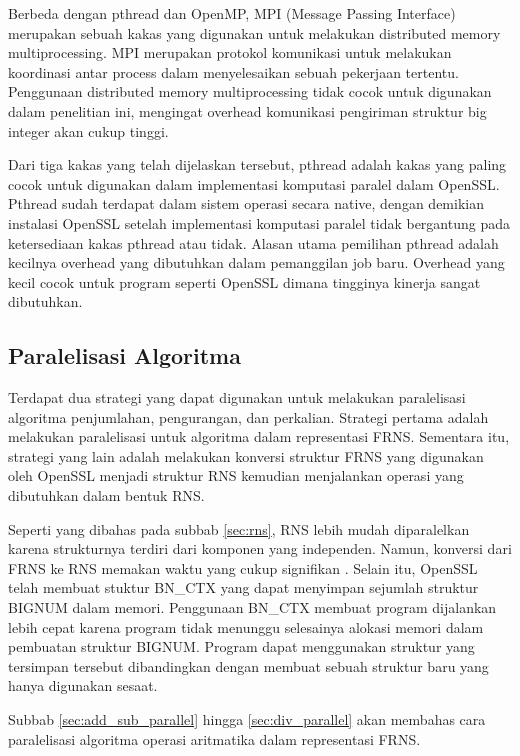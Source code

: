 Berbeda dengan pthread dan OpenMP, MPI (Message Passing Interface) merupakan sebuah kakas yang digunakan untuk melakukan distributed memory multiprocessing. MPI merupakan protokol komunikasi untuk melakukan koordinasi antar process dalam menyelesaikan sebuah pekerjaan tertentu. Penggunaan distributed memory multiprocessing tidak cocok untuk digunakan dalam penelitian ini, mengingat overhead komunikasi pengiriman struktur big integer akan cukup tinggi.

Dari tiga kakas yang telah dijelaskan tersebut, pthread adalah kakas yang paling cocok untuk digunakan dalam implementasi komputasi paralel dalam OpenSSL. Pthread sudah terdapat dalam sistem operasi secara native, dengan demikian instalasi OpenSSL setelah implementasi komputasi paralel tidak bergantung pada ketersediaan kakas pthread atau tidak. Alasan utama pemilihan pthread adalah kecilnya overhead yang dibutuhkan dalam pemanggilan job baru. Overhead yang kecil cocok untuk program seperti OpenSSL dimana tingginya kinerja sangat dibutuhkan.

\subsection{Paralelisasi Algoritma}
Terdapat dua strategi yang dapat digunakan untuk melakukan paralelisasi algoritma penjumlahan, pengurangan, dan perkalian. Strategi pertama adalah melakukan paralelisasi untuk algoritma dalam representasi FRNS. Sementara itu, strategi yang lain adalah melakukan konversi struktur FRNS yang digunakan oleh OpenSSL menjadi struktur RNS kemudian menjalankan operasi yang dibutuhkan dalam bentuk RNS.

Seperti yang dibahas pada subbab \ref{sec:rns}, RNS lebih mudah diparalelkan karena strukturnya terdiri dari komponen yang independen. Namun, konversi dari FRNS ke RNS memakan waktu yang cukup signifikan . Selain itu, OpenSSL telah membuat stuktur BN\_CTX yang dapat menyimpan sejumlah struktur BIGNUM dalam memori. Penggunaan BN\_CTX membuat program dijalankan lebih cepat karena program tidak menunggu selesainya alokasi memori dalam pembuatan struktur BIGNUM. Program dapat menggunakan struktur yang tersimpan tersebut dibandingkan dengan membuat sebuah struktur baru yang hanya digunakan sesaat.

Subbab \ref{sec:add_sub_parallel} hingga \ref{sec:div_parallel} akan membahas cara paralelisasi algoritma operasi aritmatika dalam representasi FRNS.

